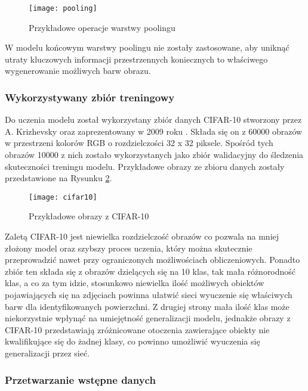   \begin{figure}[h]
   \centering
   \texttt{[image: pooling]}
   \caption[Przykładowe operacje warstwy poolingu - źródło: Rysunek własny]{Przykładowe operacje warstwy poolingu}
   \label{fig:pooling}
  \end{figure}

  W modelu końcowym warstwy poolingu nie zostały zastosowane, aby uniknąć utraty
  kluczowych informacji przestrzennych koniecznych to właściwego wygenerowanie
  możliwych barw obrazu.

  \subsubsection{Wykorzystywany zbiór treningowy}

  Do uczenia modelu został wykorzystany zbiór danych CIFAR-10 stworzony przez
  A. Krizhevsky oraz zaprezentowany w 2009 roku \cite{cifar-10}.
  Składa się on z 60000 obrazów w przestrzeni kolorów RGB o rozdzielczości 32 x 32 piksele.
  Spośród tych obrazów 10000 z nich zostało wykorzystanych jako zbiór
  walidacyjny do śledzenia skuteczności treningu modelu. Przykładowe obrazy
  ze zbioru danych zostały przedstawione na Rysunku \ref{fig:cifar10}.

  \begin{figure}[h]
   \centering
   \texttt{[image: cifar10]}
   \caption[Przykładowe obrazy z CIFAR-10 - źródło: Rysunek własny]
   {Przykładowe obrazy z CIFAR-10}
   \label{fig:cifar10}
  \end{figure}

  Zaletą CIFAR-10 jest niewielka rozdzielczość obrazów co pozwala na mniej
  złożony model oraz szybszy proces uczenia, który można skutecznie przeprowadzić
  nawet przy ograniczonych możliwościach obliczeniowych. Ponadto zbiór ten składa
  się z obrazów dzielących się na 10 klas, tak mała różnorodność klas, a co za
  tym idzie, stosunkowo niewielka ilość możliwych obiektów pojawiających się
  na zdjęciach powinna ułatwić sieci wyuczenie się właściwych barw dla
  identyfikowanych powierzchni. Z drugiej strony mała ilość klas może niekorzystnie
  wpłynąć na umiejętność generalizacji modelu, jednakże obrazy z CIFAR-10
  przedstawiają zróżnicowane otoczenia zawierające obiekty nie kwalifikujące
  się do żadnej klasy, co powinno umożliwić wyuczenia się generalizacji przez
  sieć.

  \subsubsection{Przetwarzanie wstępne danych}

